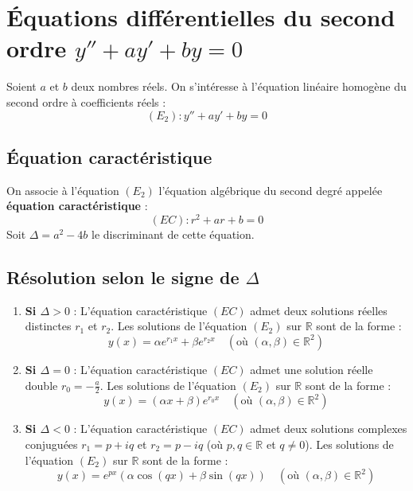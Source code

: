 \documentclass{article}
\begin{document}
	\section{Équations différentielles du second ordre $y'' + ay' + by = 0$}
	Soient $a$ et $b$ deux nombres réels. On s'intéresse à l'équation linéaire homogène du second ordre à coefficients réels :
	\[ (E_2) : y'' + ay' + by = 0 \]
	
	\subsection{Équation caractéristique}
	On associe à l'équation $(E_2)$ l'équation algébrique du second degré appelée \textbf{équation caractéristique} :
	\[ (EC) : r^2 + ar + b = 0 \]
	Soit $\Delta = a^2 - 4b$ le discriminant de cette équation.
	
	\subsection{Résolution selon le signe de $\Delta$}
	\begin{enumerate}
		\item \textbf{Si $\Delta > 0$} :
		L'équation caractéristique $(EC)$ admet deux solutions réelles distinctes $r_1$ et $r_2$.
		Les solutions de l'équation $(E_2)$ sur $\mathbb{R}$ sont de la forme :
		\[ y(x) = \alpha e^{r_1 x} + \beta e^{r_2 x} \quad (\text{où } (\alpha, \beta) \in \mathbb{R}^2) \]
		
		\item \textbf{Si $\Delta = 0$} :
		L'équation caractéristique $(EC)$ admet une solution réelle double $r_0 = -\frac{a}{2}$.
		Les solutions de l'équation $(E_2)$ sur $\mathbb{R}$ sont de la forme :
		\[ y(x) = (\alpha x + \beta) e^{r_0 x} \quad (\text{où } (\alpha, \beta) \in \mathbb{R}^2) \]
		
		\item \textbf{Si $\Delta < 0$} :
		L'équation caractéristique $(EC)$ admet deux solutions complexes conjuguées $r_1 = p + iq$ et $r_2 = p - iq$ (où $p, q \in \mathbb{R}$ et $q \ne 0$).
		Les solutions de l'équation $(E_2)$ sur $\mathbb{R}$ sont de la forme :
		\[ y(x) = e^{px} \left( \alpha \cos(qx) + \beta \sin(qx) \right) \quad (\text{où } (\alpha, \beta) \in \mathbb{R}^2) \]
	\end{enumerate}
	
\end{document}

